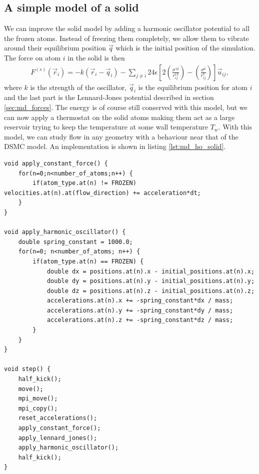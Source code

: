 \subsection{A simple model of a solid}
\label{sec:md_simple_model_of_a_solid}
We can improve the solid model by adding a harmonic oscillator potential to all the frozen atoms. Instead of freezing them completely, we allow them to vibrate around their equilibrium position $\vec q$ which is the initial position of the simulation. The force on atom $i$ in the solid is then
\begin{align}
	F^{(s)}(\vec r_i) = -k(\vec r_i - \vec q_i) 
	- \sum_{j\neq i} 24\epsilon\left[2\left(\frac{\sigma^{12}}{r_{ij}^{13}}\right) - \left(\frac{\sigma^6}{r_{ij}^7}\right)\right]\vec u_{ij},
\end{align}
where $k$ is the strength of the oscillator, $\vec q_i$ is the equilibrium position for atom $i$ and the last part is the Lennard-Jones potential described in section \ref{sec:md_forces}. The energy is of course still conserved with this model, but we can now apply a thermostat on the solid atoms making them act as a large reservoir trying to keep the temperature at some wall temperature $T_w$. With this model, we can study flow in any geometry with a behaviour near that of the DSMC model. An implementation is shown in listing \ref{lst:md_ho_solid}.

\begin{lstlisting}[caption=Implementation of the harmonic oscillator model of a solid., label=lst:md_ho_solid]
void apply_constant_force() {
    for(n=0;n<number_of_atoms;n++) {
        if(atom_type.at(n) != FROZEN) velocities.at(n).at(flow_direction) += acceleration*dt;
    }
}

void apply_harmonic_oscillator() {
    double spring_constant = 1000.0;
    for(n=0; n<number_of_atoms; n++) {
        if(atom_type.at(n) == FROZEN) {
            double dx = positions.at(n).x - initial_positions.at(n).x;
            double dy = positions.at(n).y - initial_positions.at(n).y;
            double dz = positions.at(n).z - initial_positions.at(n).z;
            accelerations.at(n).x += -spring_constant*dx / mass;
            accelerations.at(n).y += -spring_constant*dy / mass;
            accelerations.at(n).z += -spring_constant*dz / mass;
        }
    }
}

void step() {
    half_kick();
    move();
    mpi_move();
    mpi_copy();
    reset_accelerations();
    apply_constant_force();
    apply_lennard_jones();
    apply_harmonic_oscillator();
    half_kick();
}
\end{lstlisting}